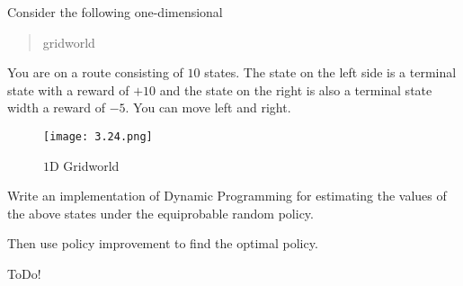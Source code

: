 
\begin{exercise}

Consider the following one-dimensional \blockquote{gridworld}:
You are on a route consisting of $10$ states.
The state on the left side is a terminal state with a reward of $+10$ and the state on the right is also a terminal state width a reward of $-5$.
You can move left and right.

\begin{figure}[H]
    \centering
    \texttt{[image: 3.24.png]}
    \caption{$1$D Gridworld}
    \label{fig:3.24}
\end{figure}

Write an implementation of Dynamic Programming for estimating the values of the above states under the equiprobable random policy.

Then use policy improvement to find the optimal policy.

\end{exercise}


\begin{solution}

ToDo!

\end{solution}

